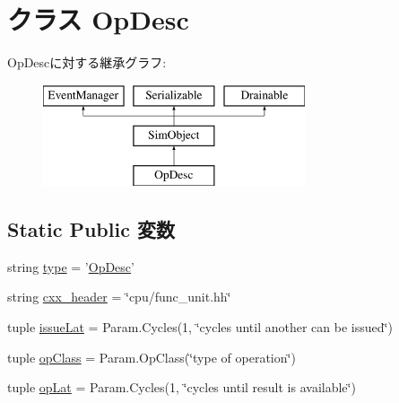 \hypertarget{classFuncUnit_1_1OpDesc}{
\section{クラス OpDesc}
\label{classFuncUnit_1_1OpDesc}
}
OpDescに対する継承グラフ:\begin{figure}[H]
\begin{center}
\leavevmode
\includegraphics[height=3cm]{classFuncUnit_1_1OpDesc}
\end{center}
\end{figure}
\subsection*{Static Public 変数}
\begin{DoxyCompactItemize}
\item 
string \hyperlink{classFuncUnit_1_1OpDesc_acce15679d830831b0bbe8ebc2a60b2ca}{type} = '\hyperlink{classFuncUnit_1_1OpDesc}{OpDesc}'
\item 
string \hyperlink{classFuncUnit_1_1OpDesc_a17da7064bc5c518791f0c891eff05fda}{cxx\_\-header} = \char`\"{}cpu/func\_\-unit.hh\char`\"{}
\item 
tuple \hyperlink{classFuncUnit_1_1OpDesc_a1260d42d5e46d079562856033114905c}{issueLat} = Param.Cycles(1, \char`\"{}cycles until another can be issued\char`\"{})
\item 
tuple \hyperlink{classFuncUnit_1_1OpDesc_a5ecb2be2abbb3f1b98624255ef24e372}{opClass} = Param.OpClass(\char`\"{}type of operation\char`\"{})
\item 
tuple \hyperlink{classFuncUnit_1_1OpDesc_a74d6c7d348235c1e30e0fd7c1322a773}{opLat} = Param.Cycles(1, \char`\"{}cycles until result is available\char`\"{})
\end{DoxyCompactItemize}


